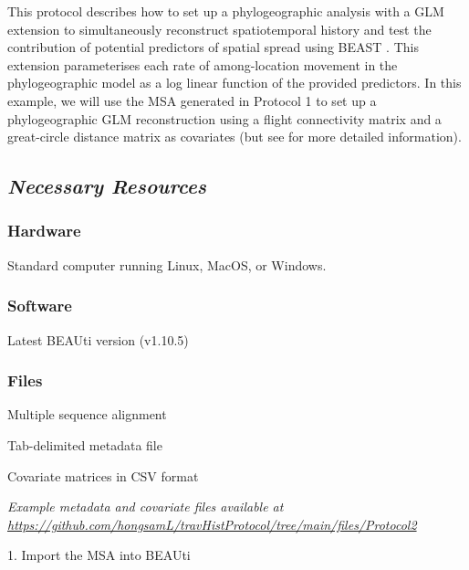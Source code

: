 \documentclass{article}
\newcommand{\ann}[1]{
\begin{adjustwidth}{0.5cm}{}
\it{#1}\\
\end{adjustwidth}}
\begin{document}
This protocol describes how to set up a phylogeographic analysis with a GLM extension to simultaneously reconstruct spatiotemporal history and test the contribution of potential predictors of spatial spread using BEAST \cite{glm}.
This  extension parameterises each rate of among-location movement in the phylogeographic model as a log linear function of the provided predictors.
In this example, we will use the MSA generated in Protocol 1 to set up a phylogeographic GLM reconstruction using a flight connectivity matrix and a great-circle distance matrix as covariates (but see \cite{travhist} for more detailed information). %


\subsection*{\textbf{\textit{Necessary Resources}}}
\subsubsection*{Hardware}
\hspace{0.5cm}Standard computer running Linux, MacOS, or Windows. 

\subsubsection*{Software}
\hspace{0.5cm}Latest BEAUti version (v1.10.5)

\subsubsection*{Files}
\hspace{0.5cm}Multiple sequence alignment

\hspace{0.5cm}Tab-delimited metadata file

\hspace{0.5cm}Covariate matrices in CSV format\\

\ann{Example metadata and covariate files available at\\
\url{https://github.com/hongsamL/travHistProtocol/tree/main/files/Protocol2}} 

1. Import the MSA into BEAUti\\
\end{document}
